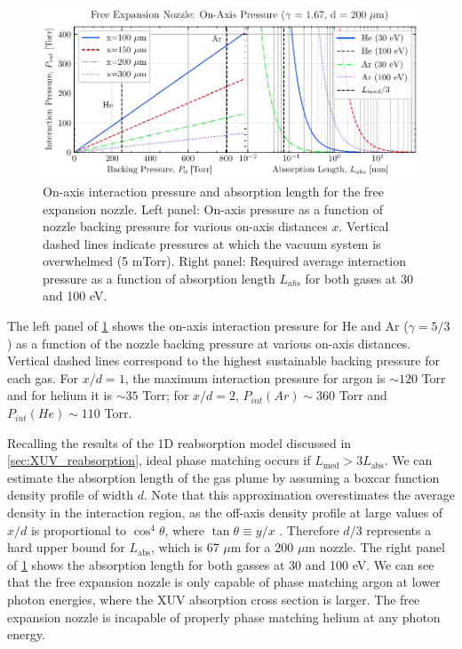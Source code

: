 
\begin{figure}
	\centering
	\includegraphics[width=1.0\textwidth]{figures/chap3/on-axis-pressure.pdf}
	\caption{On-axis interaction pressure and absorption length for the free expansion nozzle. Left panel: On-axis pressure as a function of nozzle backing pressure for various on-axis distances $x$. Vertical dashed lines indicate pressures at which the vacuum system is overwhelmed (5 mTorr). Right panel: Required average interaction pressure as a function of absorption length $L_{abs}$ for both gases at 30 and 100 eV.}
	\label{fig:on-axis-pressure}
\end{figure}

The left panel of \cref{fig:on-axis-pressure} shows the on-axis interaction pressure for He and Ar ($\gamma = 5/3$) as a function of the nozzle backing pressure at various on-axis distances. Vertical dashed lines correspond to the highest sustainable backing pressure for each gas. For $x/d = 1$, the maximum interaction pressure for argon is $\sim 120$ Torr and for helium it is $\sim 35$ Torr; for $x/d = 2$, $P_{int}(Ar) \sim 360$ Torr and $P_{int}(He) \sim 110$ Torr.

Recalling the results of the 1D reabsorption model discussed in \cref{sec:XUV_reabsorption}, ideal phase matching occurs if $L_{\textrm{med}} > 3 L_{\textrm{abs}}$. We can estimate the absorption length of the gas plume by assuming a boxcar function density profile of width $d$. Note that this approximation overestimates the average density in the interaction region, as the off-axis density profile at large values of $x/d$ is proportional to $\cos^4 \theta$, where $\tan \theta \equiv y/x$ \cite{millerFreeJetSources1988}. Therefore $d/3$ represents a hard upper bound for $L_{\textrm{abs}}$, which is 67 $\mu$m for a 200 $\mu$m nozzle. The right panel of \cref{fig:on-axis-pressure} shows the absorption length for both gasses at 30 and 100 eV. We can see that the free expansion nozzle is only capable of phase matching argon at lower photon energies, where the XUV absorption cross section is larger. The free expansion nozzle is incapable of properly phase matching helium at any photon energy.

